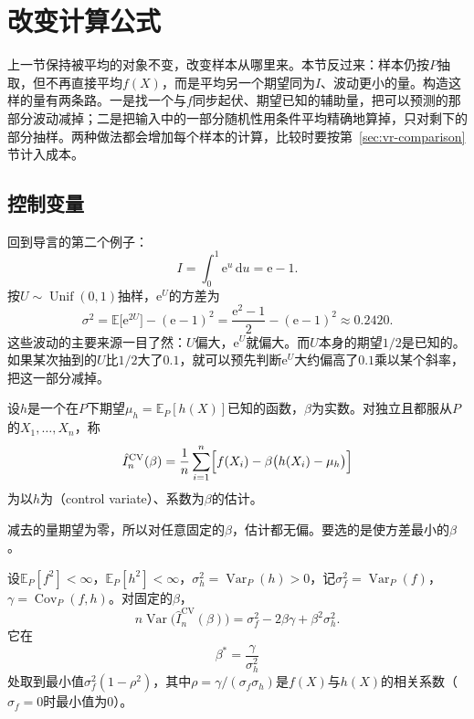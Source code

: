 \section{改变计算公式}
\label{sec:vr-change-formula}

上一节保持被平均的对象不变，改变样本从哪里来。本节反过来：样本仍按$P$抽取，但不再直接平均$f(X)$，而是平均另一个期望同为$I$、波动更小的量。构造这样的量有两条路。一是找一个与$f$同步起伏、期望已知的辅助量，把可以预测的那部分波动减掉；二是把输入中的一部分随机性用条件平均精确地算掉，只对剩下的部分抽样。两种做法都会增加每个样本的计算，比较时要按第~\ref{sec:vr-comparison}节计入成本。

\subsection{控制变量}
\label{sec:vr-control-variates}

回到导言的第二个例子：
\[
 I=\int_0^1\mathrm{e}^{u}\,\mathrm{d}u=\mathrm{e}-1 .
\]
按$U\sim\operatorname{Unif}(0,1)$抽样，$\mathrm{e}^{U}$的方差为
\[
 \sigma^2=\mathbb{E}\bigl[\mathrm{e}^{2U}\bigr]-(\mathrm{e}-1)^2=\frac{\mathrm{e}^2-1}{2}-(\mathrm{e}-1)^2\approx0.2420 .
\]
这些波动的主要来源一目了然：$U$偏大，$\mathrm{e}^{U}$就偏大。而$U$本身的期望$1/2$是已知的。如果某次抽到的$U$比$1/2$大了$0.1$，就可以预先判断$\mathrm{e}^{U}$大约偏高了$0.1$乘以某个斜率，把这一部分减掉。

\begin{definition}[控制变量估计]
\label{def:vr-control-variate}
设$h$是一个在$P$下期望$\mu_h=\mathbb{E}_P[h(X)]$已知的函数，$\beta$为实数。对独立且都服从$P$的$X_1,\dots,X_n$，称
\begin{equation}
 \hat{I}_n^{\mathrm{CV}}(\beta)=\frac1n\sum_{i=1}^{n}\Bigl[f(X_i)-\beta\bigl(h(X_i)-\mu_h\bigr)\Bigr]
 \label{eq:vr-control-variate}
\end{equation}
为以$h$为（control variate）、系数为$\beta$的估计。
\end{definition}

减去的量期望为零，所以对任意固定的$\beta$，估计都无偏。要选的是使方差最小的$\beta$。

\begin{theorem}[控制变量的最优系数]
\label{thm:vr-control-variate}
设$\mathbb{E}_P[f^2]<\infty$，$\mathbb{E}_P[h^2]<\infty$，$\sigma_h^2=\operatorname{Var}_P(h)>0$，记$\sigma_f^2=\operatorname{Var}_P(f)$，$\gamma=\operatorname{Cov}_P(f,h)$。对固定的$\beta$，
\begin{equation}
 n\operatorname{Var}\bigl(\hat{I}_n^{\mathrm{CV}}(\beta)\bigr)=\sigma_f^2-2\beta\gamma+\beta^2\sigma_h^2 .
 \label{eq:vr-cv-variance}
\end{equation}
它在
\begin{equation}
 \beta^{*}=\frac{\gamma}{\sigma_h^2}
 \label{eq:vr-cv-beta}
\end{equation}
处取到最小值$\sigma_f^2(1-\rho^2)$，其中$\rho=\gamma/(\sigma_f\sigma_h)$是$f(X)$与$h(X)$的相关系数（$\sigma_f=0$时最小值为$0$）。
\end{theorem}

